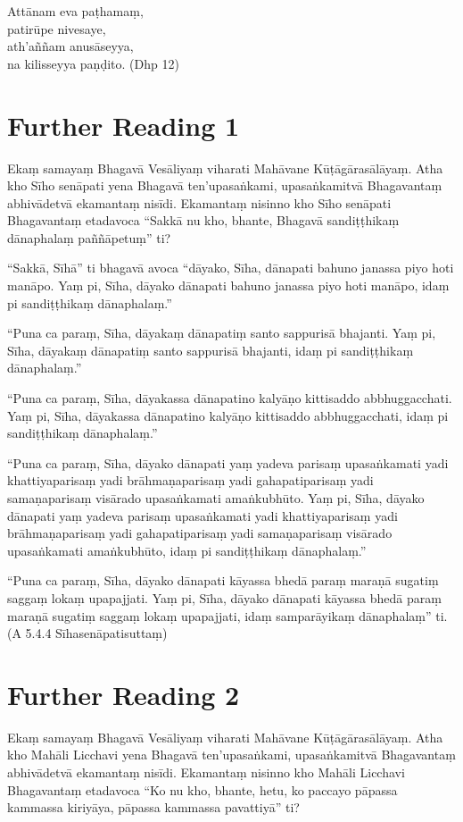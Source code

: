 Attānam eva paṭhamaṃ,\\
patirūpe nivesaye,\\
ath’aññam anusāseyya,\\
na kilisseyya paṇḍito. (Dhp 12)

\section*{Further Reading 1}

Ekaṃ samayaṃ Bhagavā Vesāliyaṃ viharati Mahāvane Kūṭāgārasālāyaṃ. Atha kho Sīho senāpati yena Bhagavā ten’upasaṅkami, upasaṅkamitvā Bhagavantaṃ abhivādetvā ekamantaṃ nisīdi. Ekamantaṃ nisinno kho Sīho senāpati Bhagavantaṃ etadavoca “Sakkā nu kho, bhante, Bhagavā sandiṭṭhikaṃ dānaphalaṃ paññāpetuṃ” ti?

“Sakkā, Sīhā” ti bhagavā avoca “dāyako, Sīha, dānapati bahuno janassa piyo hoti manāpo. Yaṃ pi, Sīha, dāyako dānapati bahuno janassa piyo hoti manāpo, idaṃ pi sandiṭṭhikaṃ dānaphalaṃ.”

“Puna ca paraṃ, Sīha, dāyakaṃ dānapatiṃ santo sappurisā bhajanti. Yaṃ pi, Sīha, dāyakaṃ dānapatiṃ santo sappurisā bhajanti, idaṃ pi sandiṭṭhikaṃ dānaphalaṃ.”

“Puna ca paraṃ, Sīha, dāyakassa dānapatino kalyāṇo kittisaddo abbhuggacchati. Yaṃ pi, Sīha, dāyakassa dānapatino kalyāṇo kittisaddo abbhuggacchati, idaṃ pi sandiṭṭhikaṃ dānaphalaṃ.”

“Puna ca paraṃ, Sīha, dāyako dānapati yaṃ yadeva parisaṃ upasaṅkamati yadi khattiyaparisaṃ yadi brāhmaṇaparisaṃ yadi gahapatiparisaṃ yadi samaṇaparisaṃ visārado upasaṅkamati amaṅkubhūto. Yaṃ pi, Sīha, dāyako dānapati yaṃ yadeva parisaṃ upasaṅkamati yadi khattiyaparisaṃ yadi brāhmaṇaparisaṃ yadi gahapatiparisaṃ yadi samaṇaparisaṃ visārado upasaṅkamati amaṅkubhūto, idaṃ pi sandiṭṭhikaṃ dānaphalaṃ.”

“Puna ca paraṃ, Sīha, dāyako dānapati kāyassa bhedā paraṃ maraṇā sugatiṃ saggaṃ lokaṃ upapajjati. Yaṃ pi, Sīha, dāyako dānapati kāyassa bhedā paraṃ maraṇā sugatiṃ saggaṃ lokaṃ upapajjati, idaṃ samparāyikaṃ dānaphalaṃ” ti. (A 5.4.4 Sīhasenāpatisuttaṃ)

\section*{Further Reading 2}

Ekaṃ samayaṃ Bhagavā Vesāliyaṃ viharati Mahāvane Kūṭāgārasālāyaṃ. Atha kho Mahāli Licchavi yena Bhagavā ten’upasaṅkami, upasaṅkamitvā Bhagavantaṃ abhivādetvā ekamantaṃ nisīdi. Ekamantaṃ nisinno kho Mahāli Licchavi Bhagavantaṃ etadavoca “Ko nu kho, bhante, hetu, ko paccayo pāpassa kammassa kiriyāya, pāpassa kammassa pavattiyā” ti?

